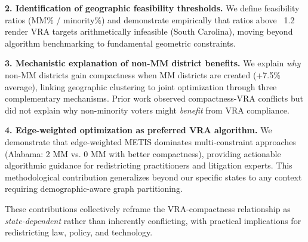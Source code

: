 \textbf{2. Identification of geographic feasibility thresholds.} We define feasibility ratios (MM\% / minority\%) and demonstrate empirically that ratios above ~1.2 render VRA targets arithmetically infeasible (South Carolina), moving beyond algorithm benchmarking to fundamental geometric constraints.

\textbf{3. Mechanistic explanation of non-MM district benefits.} We explain \emph{why} non-MM districts gain compactness when MM districts are created (+7.5\% average), linking geographic clustering to joint optimization through three complementary mechanisms. Prior work observed compactness-VRA conflicts but did not explain why non-minority voters might \emph{benefit} from VRA compliance.

\textbf{4. Edge-weighted optimization as preferred VRA algorithm.} We demonstrate that edge-weighted METIS dominates multi-constraint approaches (Alabama: 2 MM vs. 0 MM with better compactness), providing actionable algorithmic guidance for redistricting practitioners and litigation experts. This methodological contribution generalizes beyond our specific states to any context requiring demographic-aware graph partitioning.

These contributions collectively reframe the VRA-compactness relationship as \emph{state-dependent} rather than inherently conflicting, with practical implications for redistricting law, policy, and technology.
